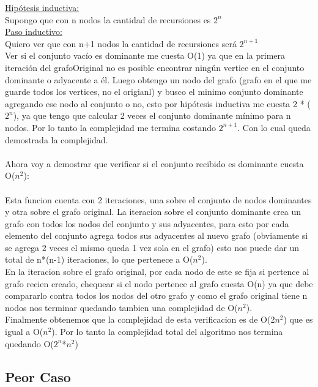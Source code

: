 \underline{Hipótesis inductiva:}\\

Supongo que con n nodos la cantidad de recursiones es $2^n$ \\

\underline{Paso inductivo:}\\

Quiero ver que con n+1 nodos la cantidad de recursiones será $2^{n+1}$\\

Ver si el conjunto vacío es dominante me cuesta O(1) ya que en la primera iteración del grafoOriginal no es posible encontrar ningún vertice en el conjunto dominante o adyacente a él. Luego obtengo un nodo del grafo (grafo en el que me guarde todos los vertices, no el origianl) y busco el minimo conjunto dominante agregando ese nodo al conjunto o no, esto por hipótesis inductiva me cuesta 2 * ($2^n$), ya que tengo que calcular 2 veces el conjunto dominante mínimo para n nodos. Por lo tanto la complejidad me termina costando  $2^{n+1}$. Con lo cual queda demostrada la complejidad.\\
\\
Ahora voy a demostrar que verificar si el conjunto recibido es dominante cuesta  O($n^2$):\\
\\
 Esta funcion cuenta con 2 iteraciones, una sobre el conjunto de nodos dominantes y otra sobre el grafo original. La iteracion sobre el conjunto dominante crea un grafo con todos los nodos del conjunto y sus adyacentes, para esto por cada elemento del conjunto agrega todos sus adyacentes al nuevo grafo (obviamente si se agrega 2 veces el mismo queda 1 vez sola en el grafo) esto nos puede dar un total de n*(n-1) iteraciones, lo que pertenece a O($n^2$).\\
En la iteracion sobre el grafo original, por cada nodo de este se fija si pertence al grafo recien creado, chequear si el nodo pertence al grafo cuesta O(n) ya que debe compararlo contra todos los nodos del otro grafo y como el grafo original tiene n nodos nos terminar quedando tambien una complejidad de O($n^2$).\\
Finalmente obtenemos que la complejidad de esta verificacion es de O(2$n^2$) que es igual a O($n^2$). Por lo tanto la complejidad total del algoritmo nos termina quedando O($2^n$*$n^2$)\\


\subsection{Peor Caso}


